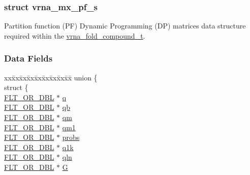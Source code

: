 \subsubsection{struct vrna\+\_\+mx\+\_\+pf\+\_\+s}
Partition function (PF) Dynamic Programming (DP) matrices data structure required within the \mbox{\hyperlink{group__fold__compound_ga1b0cef17fd40466cef5968eaeeff6166}{vrna\+\_\+fold\+\_\+compound\+\_\+t}}. \subsubsection*{Data Fields}
\begin{DoxyCompactItemize}
\item 
\begin{tabbing}
xx\=xx\=xx\=xx\=xx\=xx\=xx\=xx\=xx\=\kill
union \{\\
\>struct \{\\
\>\>\mbox{\hyperlink{group__data__structures_ga31125aeace516926bf7f251f759b6126}{FLT\_OR\_DBL}} $\ast$ \mbox{\hyperlink{group__dp__matrices_a033a0277ac33736256c6a13f13d75879}{q}}\\
\>\>\mbox{\hyperlink{group__data__structures_ga31125aeace516926bf7f251f759b6126}{FLT\_OR\_DBL}} $\ast$ \mbox{\hyperlink{group__dp__matrices_abd5ea8aa63458625d0c8b2a868fcfa28}{qb}}\\
\>\>\mbox{\hyperlink{group__data__structures_ga31125aeace516926bf7f251f759b6126}{FLT\_OR\_DBL}} $\ast$ \mbox{\hyperlink{group__dp__matrices_a612e774309a7fd0b6812200aa31f87d5}{qm}}\\
\>\>\mbox{\hyperlink{group__data__structures_ga31125aeace516926bf7f251f759b6126}{FLT\_OR\_DBL}} $\ast$ \mbox{\hyperlink{group__dp__matrices_ad60e1fd6fa490ae72cdd899c37a52165}{qm1}}\\
\>\>\mbox{\hyperlink{group__data__structures_ga31125aeace516926bf7f251f759b6126}{FLT\_OR\_DBL}} $\ast$ \mbox{\hyperlink{group__dp__matrices_aee4b900811aa012ab135838e2e5868f2}{probs}}\\
\>\>\mbox{\hyperlink{group__data__structures_ga31125aeace516926bf7f251f759b6126}{FLT\_OR\_DBL}} $\ast$ \mbox{\hyperlink{group__dp__matrices_a6ee76a2c5cefd1a9d6addf0a32071124}{q1k}}\\
\>\>\mbox{\hyperlink{group__data__structures_ga31125aeace516926bf7f251f759b6126}{FLT\_OR\_DBL}} $\ast$ \mbox{\hyperlink{group__dp__matrices_ae3a10b81e574b966d062e705b4ad8168}{qln}}\\
\>\>\mbox{\hyperlink{group__data__structures_ga31125aeace516926bf7f251f759b6126}{FLT\_OR\_DBL}} $\ast$ \mbox{\hyperlink{group__dp__matrices_a40d61ddad03db0ba06e1848ce9004138}{G}}\\

\end{tabbing}
\end{DoxyCompactItemize}
